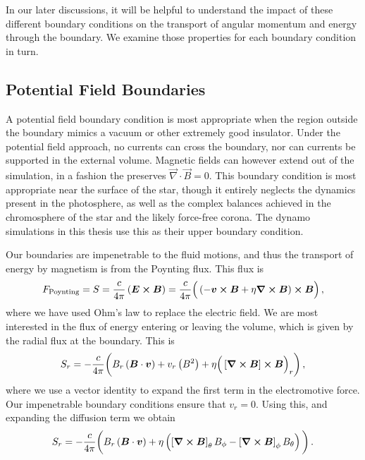 In our later discussions, it will be helpful to understand the impact
of these different boundary conditions on the transport of angular
momentum and energy through the boundary.  We examine those properties
for each boundary condition in turn.

\subsection{Potential Field Boundaries}

A potential field boundary condition is most appropriate when the
region outside the boundary mimics a vacuum or other extremely good insulator.  Under
the potential field approach, no currents can cross the boundary, nor
can currents be supported in the external volume.  Magnetic fields can
however extend out of the simulation, in a fashion the preserves
$\vec{\nabla}\cdot \vec{B}=0$.  This boundary condition is most
appropriate near the surface of the star, though it entirely neglects
the dynamics present in the photosphere, as well as the complex
balances achieved in the chromosphere of the star and the likely
force-free corona.  The dynamo simulations in this thesis use this as
their upper boundary condition.

Our boundaries are impenetrable to the fluid motions, and thus the
transport of energy by magnetism is from the Poynting flux.  This
flux is
\begin{equation}
  F_\mathrm{Poynting} = S = \frac{c}{4 \pi} \left(\boldsymbol{E} \boldsymbol{\times} \boldsymbol{B}\right) = \frac{c}{4 \pi}\Big(\left(-\boldsymbol{v} \boldsymbol{\times}  \boldsymbol{B} + \eta \boldsymbol{\nabla} \boldsymbol{\times} \boldsymbol{B}\right) \boldsymbol{\times} \boldsymbol{B}\Big)\thinspace,
\end{equation}
where we have used Ohm's law to replace the electric field.  We are
most interested in the flux of energy entering or leaving the volume,
which is given by the radial flux at the boundary.  This is
\begin{equation}
 S_r =  - \frac{c}{4 \pi} \bigg(B_r \left(\boldsymbol{B} \cdot \boldsymbol{v}\right) + v_r \left( B^2 \right) +
          \eta \Big(\left[\boldsymbol{\nabla} \boldsymbol{\times} \boldsymbol{B}\right] \boldsymbol{\times}\boldsymbol{B} \Big)_r\bigg) \thinspace,
\end{equation}
where we use a vector identity to expand the first term in the
electromotive force.  Our impenetrable boundary conditions ensure that
$v_r = 0$.  Using this, and expanding the diffusion term we obtain
\begin{equation}
 S_r =  - \frac{c}{4 \pi} \bigg(B_r \left(\boldsymbol{B} \cdot \boldsymbol{v}\right) + 
        \eta \left(
	\left[\boldsymbol{\nabla} \boldsymbol{\times} \boldsymbol{B}\right]_\theta B_\phi - 
	\left[\boldsymbol{\nabla} \boldsymbol{\times} \boldsymbol{B}\right]_\phi B_\theta 
	\right)\bigg)\thinspace.
\label{eq:radial_poynting_flux}
\end{equation}

